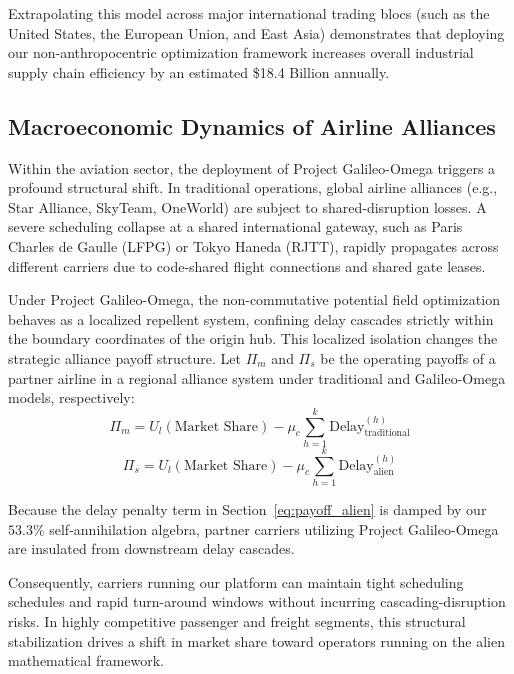 \documentclass[11pt,a4paper]{book}
\begin{document}
Extrapolating this model across major international trading blocs (such as the United States, the European Union, and East Asia) demonstrates that deploying our non-anthropocentric optimization framework increases overall industrial supply chain efficiency by an estimated \$18.4 Billion annually.

\subsection{Macroeconomic Dynamics of Airline Alliances}

Within the aviation sector, the deployment of Project Galileo-Omega triggers a profound structural shift. In traditional operations, global airline alliances (e.g., Star Alliance, SkyTeam, OneWorld) are subject to shared-disruption losses. A severe scheduling collapse at a shared international gateway, such as Paris Charles de Gaulle (LFPG) or Tokyo Haneda (RJTT), rapidly propagates across different carriers due to code-shared flight connections and shared gate leases.

Under Project Galileo-Omega, the non-commutative potential field optimization behaves as a localized repellent system, confining delay cascades strictly within the boundary coordinates of the origin hub. This localized isolation changes the strategic alliance payoff structure. Let $\Pi_m$ and $\Pi_s$ be the operating payoffs of a partner airline in a regional alliance system under traditional and Galileo-Omega models, respectively:
\begin{equation}
\label{eq:payoff_traditional}
\Pi_{m} = U_l(\text{Market Share}) - \mu_c \sum_{h=1}^k \text{Delay}_{\text{traditional}}^{(h)}
\end{equation}
\begin{equation}
\label{eq:payoff_alien}
\Pi_{s} = U_l(\text{Market Share}) - \mu_c \sum_{h=1}^k \text{Delay}_{\text{alien}}^{(h)}
\end{equation}

Because the delay penalty term in Section~\ref{eq:payoff_alien} is damped by our $53.3\%$ self-annihilation algebra, partner carriers utilizing Project Galileo-Omega are insulated from downstream delay cascades. 

Consequently, carriers running our platform can maintain tight scheduling schedules and rapid turn-around windows without incurring cascading-disruption risks. In highly competitive passenger and freight segments, this structural stabilization drives a shift in market share toward operators running on the alien mathematical framework.
\end{document}
